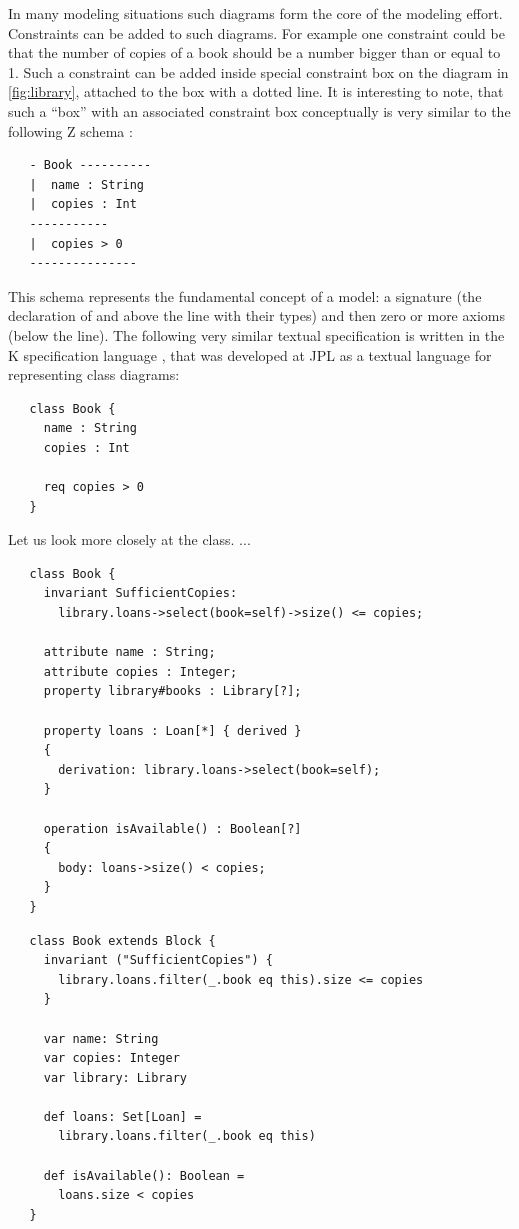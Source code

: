 In many modeling situations such diagrams form the core of the modeling effort. Constraints can be added to such diagrams.
For example one constraint could be that the number of copies of a book should be a number bigger than or equal to 1. Such a constraint can be added inside special constraint box on the diagram  in \ref{fig:library}, attached to the  box
with a dotted line. It is interesting to note, that such a ``box''
with an associated constraint box conceptually is very similar to
the following Z schema \cite{?}:

\zlang
\begin{lstlisting}
   - Book ----------
   |  name : String
   |  copies : Int
   -----------
   |  copies > 0
   ---------------
\end{lstlisting}

\noindent
This schema represents the fundamental concept of a model: a signature (the declaration of  and  above the line with their types) and then zero or more axioms (below
the line). 
%
The following very similar textual specification is written in
the K specification language \cite{?}, that was developed at JPL
as a textual language for representing class diagrams:

\klang
\begin{lstlisting}
   class Book {
     name : String
     copies : Int
   
     req copies > 0
   }
\end{lstlisting}

\noindent
Let us look more closely at the  class. ...

\oclinecore
\begin{lstlisting}
   class Book {
     invariant SufficientCopies:
       library.loans->select(book=self)->size() <= copies;

     attribute name : String;
     attribute copies : Integer;
     property library#books : Library[?];
     
     property loans : Loan[*] { derived }
     {
       derivation: library.loans->select(book=self);
     }

     operation isAvailable() : Boolean[?]
     {
       body: loans->size() < copies;
     }
   }
\end{lstlisting}

\scala
\begin{lstlisting}
   class Book extends Block {
     invariant ("SufficientCopies") {
       library.loans.filter(_.book eq this).size <= copies
     }

     var name: String
     var copies: Integer
     var library: Library

     def loans: Set[Loan] =
       library.loans.filter(_.book eq this)

     def isAvailable(): Boolean =
       loans.size < copies
   }
\end{lstlisting}

